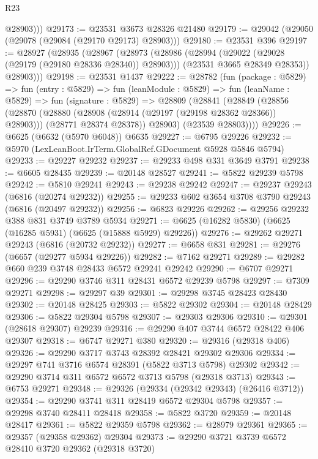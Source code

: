 \begin{lexlean}{R23}
\begin{coremodule}
          @28903)))
@29173 := @23531 @3673 @28326 @21480
@29179 := @29042 (@29050 (@29078 (@29084 (@29170 @29173) @28903)))
@29180 := @23531 @396
@29197 := @28927
    (@28935
      (@28967
        (@28973
          (@28986
            (@28994 (@29022 (@29028 (@29179 (@29180 @28336 @28340)) @28903)))
            (@23531 @3665 @28349 @28353))
          @28903)))
@29198 := @23531 @1437
@29222 := @28782
    (fun (package : @5829) =>
    fun (entry : @5829) =>
    fun (leanModule : @5829) =>
    fun (leanName : @5829) =>
    fun (signature : @5829) =>
    @28809
      (@28841
        (@28849
          (@28856
            (@28870
              (@28880 (@28908 (@28914 (@29197 (@29198 @28362 @28366)) @28903)))
              (@28771 @28374 @28378))
            @28903)
          (@23539 @28803))))
@29226 := @6625 (@6632 (@5970 @6048)) @6635
@29227 := @6795 @29226
@29232 := @5970 (LexLeanBoot.IrTerm.GlobalRef.GDocument @5928 @5846 @5794)
@29233 := @29227 @29232
@29237 := @29233 @498 @331 @3649 @3791
@29238 := @6605 @28435
@29239 := @20148 @28527
@29241 := @5822 @29239 @5798
@29242 := @5810 @29241
@29243 := @29238 @29242
@29247 := @29237 @29243 (@6816 (@20274 @29232))
@29255 := @29233 @602 @3654 @3708 @3790 @29243 (@6816 (@20497 @29232))
@29256 := @6823 @29226
@29262 := @29256 @29232 @388 @831 @3749 @3789 @5934
@29271 := @6625 (@16282 @5830) (@6625 (@16285 @5931) (@6625 (@15888 @5929) @29226))
@29276 := @29262 @29271 @29243 (@6816 (@20732 @29232))
@29277 := @6658 @831
@29281 := @29276 (@6657 (@29277 @5934 @29226))
@29282 := @7162 @29271
@29289 := @29282 @660 @239 @3748 @28433 @6572 @29241 @29242
@29290 := @6707 @29271
@29296 := @29290 @3746 @311 @28431 @6572 @29239 @5798
@29297 := @7309 @29271
@29298 := @29297 @39
@29301 := @29298 @3745 @28423 @28430
@29302 := @20148 @28425
@29303 := @5822 @29302
@29304 := @20148 @28429
@29306 := @5822 @29304 @5798
@29307 := @29303 @29306
@29310 := @29301 (@28618 @29307) @29239
@29316 := @29290 @407 @3744 @6572 @28422 @406 @29307
@29318 := @6747 @29271 @380
@29320 := @29316 (@29318 @406)
@29326 := @29290 @3717 @3743 @28392 @28421 @29302 @29306
@29334 := @29297 @741 @3716 @6574 @28391 (@5822 @3713 @5798) @29302
@29342 := @29290 @3714 @311 @6572 @6572 @3713 @5798 (@29318 @3713)
@29343 := @6753 @29271
@29348 := @29326 (@29334 (@29342 @29343) (@26416 @3712))
@29354 := @29290 @3741 @311 @28419 @6572 @29304 @5798
@29357 := @29298 @3740 @28411 @28418
@29358 := @5822 @3720
@29359 := @20148 @28417
@29361 := @5822 @29359 @5798
@29362 := @28979 @29361
@29365 := @29357 (@29358 @29362) @29304
@29373 := @29290 @3721 @3739 @6572 @28410 @3720 @29362 (@29318 @3720)

\end{coremodule}
\end{lexlean}
